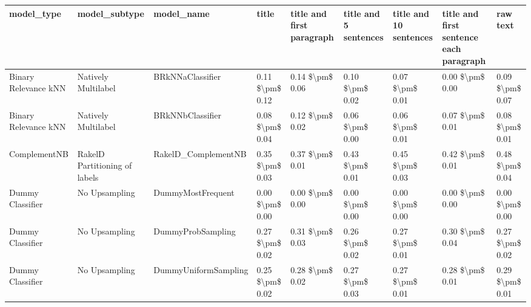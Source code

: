 \begin{tabular}{lllllllll}
\toprule
                     model\_type &                 model\_subtype &                                   model\_name &           title & title and first paragraph & title and 5 sentences & title and 10 sentences & title and first sentence each paragraph &            raw text \\
\midrule
           Binary Relevance kNN &           Natively Multilabel &                             BRkNNaClassifier & 0.11 \$\textbackslash pm\$ 0.12 &           0.14 \$\textbackslash pm\$ 0.06 &       0.10 \$\textbackslash pm\$ 0.02 &        0.07 \$\textbackslash pm\$ 0.01 &                         0.00 \$\textbackslash pm\$ 0.00 &     0.09 \$\textbackslash pm\$ 0.07 \\
           Binary Relevance kNN &           Natively Multilabel &                             BRkNNbClassifier & 0.08 \$\textbackslash pm\$ 0.04 &           0.12 \$\textbackslash pm\$ 0.02 &       0.06 \$\textbackslash pm\$ 0.00 &        0.06 \$\textbackslash pm\$ 0.01 &                         0.07 \$\textbackslash pm\$ 0.01 &     0.08 \$\textbackslash pm\$ 0.01 \\
                   ComplementNB & RakelD Partitioning of labels &                          RakelD\_ComplementNB & 0.35 \$\textbackslash pm\$ 0.03 &           0.37 \$\textbackslash pm\$ 0.01 &       0.43 \$\textbackslash pm\$ 0.01 &        0.45 \$\textbackslash pm\$ 0.03 &                         0.42 \$\textbackslash pm\$ 0.01 &     0.48 \$\textbackslash pm\$ 0.04 \\
               Dummy Classifier &                 No Upsampling &                            DummyMostFrequent & 0.00 \$\textbackslash pm\$ 0.00 &           0.00 \$\textbackslash pm\$ 0.00 &       0.00 \$\textbackslash pm\$ 0.00 &        0.00 \$\textbackslash pm\$ 0.00 &                         0.00 \$\textbackslash pm\$ 0.00 &     0.00 \$\textbackslash pm\$ 0.00 \\
               Dummy Classifier &                 No Upsampling &                            DummyProbSampling & 0.27 \$\textbackslash pm\$ 0.02 &           0.31 \$\textbackslash pm\$ 0.03 &       0.26 \$\textbackslash pm\$ 0.02 &        0.27 \$\textbackslash pm\$ 0.01 &                         0.30 \$\textbackslash pm\$ 0.04 &     0.27 \$\textbackslash pm\$ 0.02 \\
               Dummy Classifier &                 No Upsampling &                         DummyUniformSampling & 0.25 \$\textbackslash pm\$ 0.02 &           0.28 \$\textbackslash pm\$ 0.02 &       0.27 \$\textbackslash pm\$ 0.03 &        0.27 \$\textbackslash pm\$ 0.01 &                         0.28 \$\textbackslash pm\$ 0.01 &     0.29 \$\textbackslash pm\$ 0.01 \\

\end{tabular}

